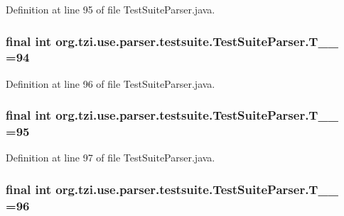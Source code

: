 Definition at line 95 of file Test\-Suite\-Parser.\-java.

\hypertarget{classorg_1_1tzi_1_1use_1_1parser_1_1testsuite_1_1_test_suite_parser_a9ea9057beaaefece3bfcbafe5a617dd7}{
\subsubsection[{T\-\_\-\-\_\-94}]{\setlength{\rightskip}{0pt plus 5cm}final int org.\-tzi.\-use.\-parser.\-testsuite.\-Test\-Suite\-Parser.\-T\-\_\-\-\_ =94\hspace{0.3cm}{\ttfamily [static]}}}\label{classorg_1_1tzi_1_1use_1_1parser_1_1testsuite_1_1_test_suite_parser_a9ea9057beaaefece3bfcbafe5a617dd7}


Definition at line 96 of file Test\-Suite\-Parser.\-java.

\hypertarget{classorg_1_1tzi_1_1use_1_1parser_1_1testsuite_1_1_test_suite_parser_ac880bf2de5e5b426487e96f023a84163}{
\subsubsection[{T\-\_\-\-\_\-95}]{\setlength{\rightskip}{0pt plus 5cm}final int org.\-tzi.\-use.\-parser.\-testsuite.\-Test\-Suite\-Parser.\-T\-\_\-\-\_ =95\hspace{0.3cm}{\ttfamily [static]}}}\label{classorg_1_1tzi_1_1use_1_1parser_1_1testsuite_1_1_test_suite_parser_ac880bf2de5e5b426487e96f023a84163}


Definition at line 97 of file Test\-Suite\-Parser.\-java.

\hypertarget{classorg_1_1tzi_1_1use_1_1parser_1_1testsuite_1_1_test_suite_parser_a4382ac04318e11fa4ee9476edcd97b8f}{
\subsubsection[{T\-\_\-\-\_\-96}]{\setlength{\rightskip}{0pt plus 5cm}final int org.\-tzi.\-use.\-parser.\-testsuite.\-Test\-Suite\-Parser.\-T\-\_\-\-\_ =96\hspace{0.3cm}{\ttfamily [static]}}}\label{classorg_1_1tzi_1_1use_1_1parser_1_1testsuite_1_1_test_suite_parser_a4382ac04318e11fa4ee9476edcd97b8f}


